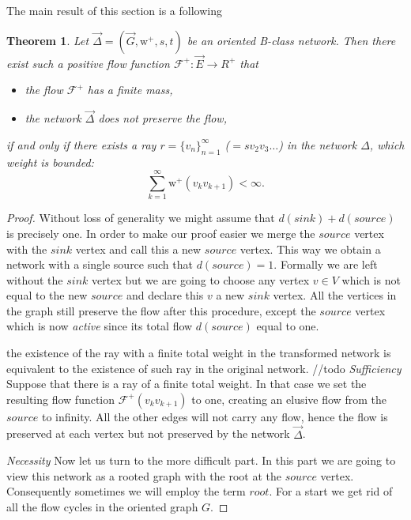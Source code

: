 \documentclass[12pt]{article}
\newtheorem{theorem}{Theorem}
\theoremstyle{definition}
\newcommand{\seq}[1]{\{{#1}_n\}_{n=1}^\infty}
\newcommand{\wtp}{\mathrm{w}^{+}}
\newcommand{\flowpos}{\mathcal{F}^{+}}
\newcommand{\source}{\mathit{source}}
\newcommand{\sink}{\mathit{sink}}
\renewcommand{\root}{\mathit{root}}
\newcommand{\net}{\Delta}
\newcommand{\onet}{\vec{\Delta}}
\numberwithin{remark}{section}
\numberwithin{theorem}{section}
\numberwithin{prop}{section}
\numberwithin{equation}{section}
\numberwithin{lemma}{section}
\numberwithin{prop_under_lemma}{lemma}
\begin{document}
    The main result of this section is a following
    \begin{theorem}
      Let $\onet = (\vec{G}, \wtp, s, t)$ be an oriented B-class network.
      Then there exist such a positive flow function $\flowpos: \vec{E} \to R^{+}$ that
      \begin{itemize}
        \item the flow $\flowpos$ has a finite mass,
        \item the network $\onet$ does not preserve the flow,
      \end{itemize}
        if and only if there exists a ray $r = \seq{v}$ ($=sv_2v_3\dots$)
        in the network $\net$, which weight is bounded:
        $$
          \sum_{k=1}^\infty \wtp(v_k v_{k+1}) < \infty.
        $$
    \end{theorem}
    \begin{proof}
      Without loss of generality we might assume that $d(\sink) + d(\source)$ is precisely one.
      In order to make our proof easier we merge the $\source$ vertex with the $\sink$ vertex and call this a
        new $\source$ vertex.
      This way we obtain a network with a single source such that $d(\source) = 1$.
      Formally we are left without the $\sink$ vertex but we are going to choose any vertex $v \in V$ which
        is not equal to the new $\source$ and declare this $v$ a new $\sink$ vertex.
      All the vertices in the graph still preserve the flow after this procedure, except the $\source$ vertex
        which is now \emph{active} since its total flow $d(\source)$ equal to one.

        the existence of the ray with a finite total weight
        in the transformed network is equivalent to the existence of such ray in the original network.
      //todo
      \noindent\textit{Sufficiency}
      Suppose that there is a ray of a finite total weight. 
      In that case we set the resulting flow function $\flowpos(v_k v_{k+1})$ to one, creating an elusive flow
        from the $\source$ to infinity. All the other edges will not carry any flow, hence the flow is preserved
        at each vertex but not preserved by the network $\onet$.

      \noindent\textit{Necessity}
      Now let us turn to the more difficult part.
      In this part we are going to view this network as a rooted graph with the root at the $\source$ vertex.
      Consequently sometimes we will employ the term $\root$.
      For a start we get rid of all the flow cycles in the oriented graph $G$.


\end{proof}
\end{document}
